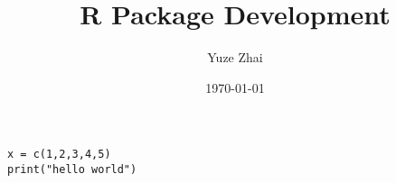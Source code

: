 \documentclass[10pt, a4paper]{report}
\title{R Package Development}
\author{Yuze Zhai}
\date{\today}
\begin{document}
\maketitle

\begin{verbatim}
x = c(1,2,3,4,5)
print("hello world")
\end{verbatim}
\end{document}
